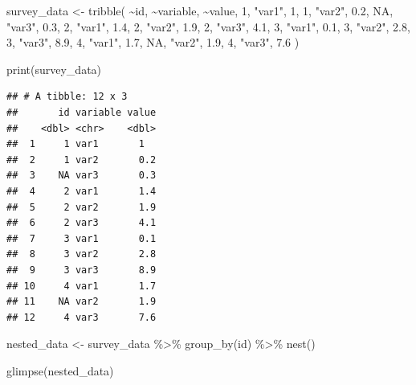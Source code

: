 \documentclass[
]{article}
\newenvironment{Shaded}{\begin{snugshade}}{\end{snugshade}}
\newcommand{\ConstantTok}[1]{\textcolor[rgb]{0.00,0.00,0.00}{#1}}
\newcommand{\DecValTok}[1]{\textcolor[rgb]{0.00,0.00,0.81}{#1}}
\newcommand{\FloatTok}[1]{\textcolor[rgb]{0.00,0.00,0.81}{#1}}
\newcommand{\FunctionTok}[1]{\textcolor[rgb]{0.00,0.00,0.00}{#1}}
\newcommand{\NormalTok}[1]{#1}
\newcommand{\OtherTok}[1]{\textcolor[rgb]{0.56,0.35,0.01}{#1}}
\newcommand{\SpecialCharTok}[1]{\textcolor[rgb]{0.00,0.00,0.00}{#1}}
\newcommand{\StringTok}[1]{\textcolor[rgb]{0.31,0.60,0.02}{#1}}
\begin{document}
\begin{Shaded}
\begin{Highlighting}[]
\NormalTok{survey\_data }\OtherTok{\textless{}{-}} \FunctionTok{tribble}\NormalTok{(}
  \SpecialCharTok{\textasciitilde{}}\NormalTok{id, }\SpecialCharTok{\textasciitilde{}}\NormalTok{variable, }\SpecialCharTok{\textasciitilde{}}\NormalTok{value,}
  \DecValTok{1}\NormalTok{, }\StringTok{"var1"}\NormalTok{, }\DecValTok{1}\NormalTok{,}
  \DecValTok{1}\NormalTok{, }\StringTok{"var2"}\NormalTok{, }\FloatTok{0.2}\NormalTok{,}
  \ConstantTok{NA}\NormalTok{, }\StringTok{"var3"}\NormalTok{, }\FloatTok{0.3}\NormalTok{,}
  \DecValTok{2}\NormalTok{, }\StringTok{"var1"}\NormalTok{, }\FloatTok{1.4}\NormalTok{,}
  \DecValTok{2}\NormalTok{, }\StringTok{"var2"}\NormalTok{, }\FloatTok{1.9}\NormalTok{,}
  \DecValTok{2}\NormalTok{, }\StringTok{"var3"}\NormalTok{, }\FloatTok{4.1}\NormalTok{,}
  \DecValTok{3}\NormalTok{, }\StringTok{"var1"}\NormalTok{, }\FloatTok{0.1}\NormalTok{,}
  \DecValTok{3}\NormalTok{, }\StringTok{"var2"}\NormalTok{, }\FloatTok{2.8}\NormalTok{,}
  \DecValTok{3}\NormalTok{, }\StringTok{"var3"}\NormalTok{, }\FloatTok{8.9}\NormalTok{,}
  \DecValTok{4}\NormalTok{, }\StringTok{"var1"}\NormalTok{, }\FloatTok{1.7}\NormalTok{,}
  \ConstantTok{NA}\NormalTok{, }\StringTok{"var2"}\NormalTok{, }\FloatTok{1.9}\NormalTok{,}
  \DecValTok{4}\NormalTok{, }\StringTok{"var3"}\NormalTok{, }\FloatTok{7.6}
\NormalTok{)}

\FunctionTok{print}\NormalTok{(survey\_data)}
\end{Highlighting}
\end{Shaded}

\begin{verbatim}
## # A tibble: 12 x 3
##       id variable value
##    <dbl> <chr>    <dbl>
##  1     1 var1       1  
##  2     1 var2       0.2
##  3    NA var3       0.3
##  4     2 var1       1.4
##  5     2 var2       1.9
##  6     2 var3       4.1
##  7     3 var1       0.1
##  8     3 var2       2.8
##  9     3 var3       8.9
## 10     4 var1       1.7
## 11    NA var2       1.9
## 12     4 var3       7.6
\end{verbatim}

\begin{Shaded}
\begin{Highlighting}[]
\NormalTok{nested\_data }\OtherTok{\textless{}{-}}\NormalTok{ survey\_data }\SpecialCharTok{\%\textgreater{}\%}
  \FunctionTok{group\_by}\NormalTok{(id) }\SpecialCharTok{\%\textgreater{}\%}  
  \FunctionTok{nest}\NormalTok{()}

\FunctionTok{glimpse}\NormalTok{(nested\_data)}
\end{Highlighting}
\end{Shaded}
\end{document}
